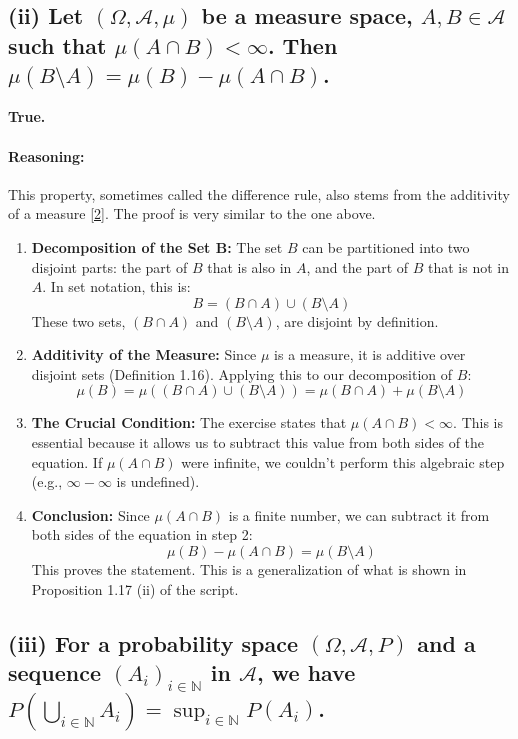\documentclass[11pt,a4paper]{article}
\begin{document}
\subsection*{(ii) Let $(\Omega, \mathcal{A}, \mu)$ be a measure space, $A, B \in \mathcal{A}$ such that $\mu(A \cap B) < \infty$. Then $\mu(B \setminus A) = \mu(B) - \mu(A \cap B)$.}

\textbf{True.}

\paragraph{Reasoning:}
This property, sometimes called the difference rule, also stems from the additivity of a measure \hyperlink{note2}{[2]}. The proof is very similar to the one above.

\begin{enumerate}
    \item \textbf{Decomposition of the Set B:} The set $B$ can be partitioned into two disjoint parts: the part of $B$ that is also in $A$, and the part of $B$ that is not in $A$. In set notation, this is:
    \[
        B = (B \cap A) \cup (B \setminus A)
    \]
    These two sets, $(B \cap A)$ and $(B \setminus A)$, are disjoint by definition.

    \item \textbf{Additivity of the Measure:} Since $\mu$ is a measure, it is additive over disjoint sets (Definition 1.16). Applying this to our decomposition of $B$:
    \[
        \mu(B) = \mu((B \cap A) \cup (B \setminus A)) = \mu(B \cap A) + \mu(B \setminus A)
    \]

    \item \textbf{The Crucial Condition:} The exercise states that $\mu(A \cap B) < \infty$. This is essential because it allows us to subtract this value from both sides of the equation. If $\mu(A \cap B)$ were infinite, we couldn't perform this algebraic step (e.g., $\infty - \infty$ is undefined).

    \item \textbf{Conclusion:} Since $\mu(A \cap B)$ is a finite number, we can subtract it from both sides of the equation in step 2:
    \[
        \mu(B) - \mu(A \cap B) = \mu(B \setminus A)
    \]
    This proves the statement. This is a generalization of what is shown in Proposition 1.17 (ii) of the script.
\end{enumerate}

\subsection*{(iii) For a probability space $(\Omega, \mathcal{A}, P)$ and a sequence $(A_i)_{i \in \mathbb{N}}$ in $\mathcal{A}$, we have $P\left(\bigcup_{i \in \mathbb{N}} A_i\right) = \sup_{i \in \mathbb{N}} P(A_i)$.}
\end{document}
